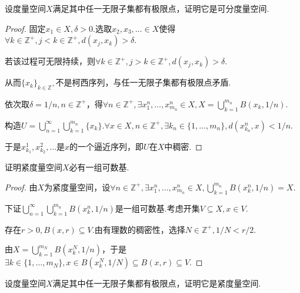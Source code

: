 \begin{problem}[24]\label{1.B.24}
    设度量空间\(X\)满足其中任一无限子集都有极限点，证明它是可分度量空间.
\end{problem}

\begin{proof}
    固定\(x_1 \in X, \delta>0\).选取\(x_2, x_3, \dots \in X\)使得\(\forall k \in \mathbb{Z}^+, j<k \in \mathbb{Z}^+, d(x_j,x_k)>\delta\).

    若该过程可无限持续，则\(\forall k \in \mathbb{Z}^+, j>k \in \mathbb{Z}^+, d(x_j,x_k)>\delta\).
    
    从而\(\{x_k\}_{k \in \mathbb{Z}^+}\)不是柯西序列，与{\kaishu 任一无限子集都有极限点}矛盾.
    
    依次取\(\delta=1/n, n \in \mathbb{Z}^+\)，得\(\forall n \in \mathbb{Z}^+, \exists x_1^n, \dots, x_{m_n}^n \in X, X=\bigcup_{k=1}^{m_n} B(x_k,1/n)\).
    
    构造\(U=\bigcup_{n=1}^\infty \bigcup_{k=1}^{m_n} \{x_k\}\).\(\forall x \in X, n \in \mathbb{Z}^+, \exists k_n \in \{1, \dots, m_n\}, d(x_{k_n}^n,x)<1/n\).

    于是\(x_{k_1}^1, x_{k_2}^2, \dots\)是\(x\)的一个逼近序列，即\(U\)在\(X\)中稠密.
\end{proof}

\begin{problem}[25]\label{1.B.25}
    证明紧度量空间\(X\)必有一组可数基.
\end{problem}

\begin{proof}
    由\(X\)为紧度量空间，设\(\forall n \in \mathbb{Z}^+, \exists x_1^n, \dots, x_{m_n}^n \in X, \bigcup_{k=1}^{m_n} B(x_k^n, 1/n)=X\).

    下证\(\bigcup_{n=1}^\infty \bigcup_{k=1}^{m_n} B(x_k^n, 1/n)\)是一组可数基.考虑开集\(V \subseteq X, x \in V\).

    存在\(r>0, B(x,r) \subseteq V\).由有理数的稠密性，选择\(N \in \mathbb{Z}^+, 1/N<r/2\).
    
    由\(X=\bigcup_{k=1}^{m_N} B(x_k^N, 1/n)\)，于是\(\exists k \in \{1, \dots, m_N\}, x \in B(x_k^N, 1/N) \subseteq B(x,r) \subseteq V\).
\end{proof}

\begin{problem}[26]\label{1.B.26}
    设度量空间\(X\)满足其中任一无限子集都有极限点，证明它是紧度量空间.
\end{problem}

